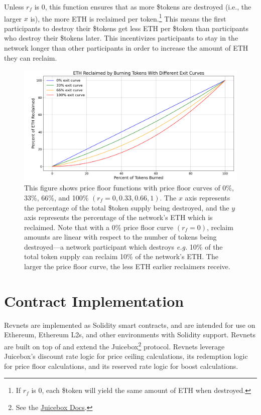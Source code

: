 \documentclass{article}
\begin{document}
Unless $r_f$ is 0, this function ensures that as more \$tokens are destroyed (i.e., the larger $x$ is), the more ETH is reclaimed per token.\footnote{If $r_f$ is 0, each \$token will yield the same amount of ETH when destroyed.} This means the first participants to destroy their \$tokens get less ETH per \$token than participants who destroy their \$tokens later. This incentivizes participants to stay in the network longer than other participants in order to increase the amount of ETH they can reclaim.

\begin{figure}[ht]
  \centering
  \includegraphics[width=\textwidth]{figures/multi-exit-curves.png}
  \caption{This figure shows price floor functions with price floor curves of 0\%, 33\%, 66\%, and 100\% $(r_f = 0, 0.33, 0.66, 1)$. The $x$ axis represents the percentage of the total \$token supply being destroyed, and the $y$ axis represents the percentage of the network's ETH which is reclaimed. Note that with a 0\% price floor curve $(r_f = 0)$, reclaim amounts are linear with respect to the number of tokens being destroyed---a network participant which destroys \textit{e.g.} 10\% of the total token supply can reclaim 10\% of the network's ETH. The larger the price floor curve, the less ETH earlier reclaimers receive.}
\end{figure}

\section{Contract Implementation}

Revnets are implemented as Solidity smart contracts, and are intended for use on Ethereum, Ethereum L2s,  and other environments with Solidity support. Revnets are built on top of and extend the Juicebox\footnote{See the \href{https://docs.juicebox.money}{Juicebox Docs}.} protocol. Revnets leverage Juicebox's discount rate logic for price ceiling calculations, its redemption logic for price floor calculations, and its reserved rate logic for boost calculations.
\end{document}
